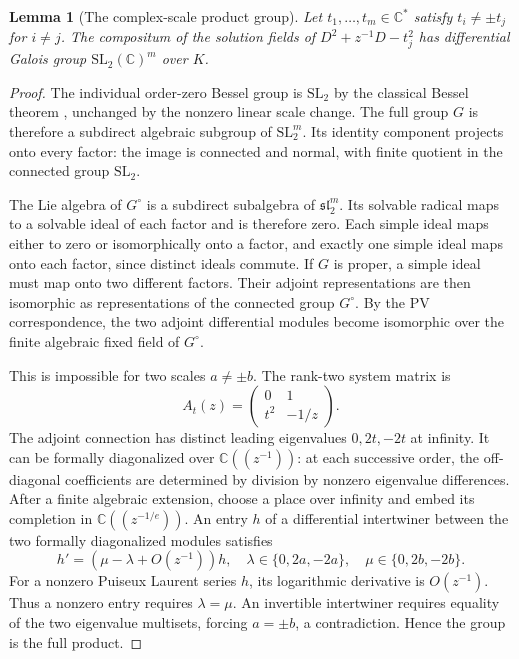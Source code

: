 \documentclass[11pt]{article}
\newtheorem{lemma}[theorem]{Lemma}
\theoremstyle{definition}
\theoremstyle{remark}
\begin{document}
\begin{lemma}[The complex-scale product group]\label{cf:product}
Let $t_1,\ldots,t_m\in\mathbb C^*$ satisfy $t_i\ne\pm t_j$ for $i\ne j$.
The compositum of the solution fields of
$D^2+z^{-1}D-t_j^2$ has differential Galois group
$\mathrm{SL}_2(\mathbb C)^m$ over $K$.
\end{lemma}
\begin{proof}
The individual order-zero Bessel group is $\mathrm{SL}_2$ by the classical
Bessel theorem \cite{Kolchin}, unchanged by the nonzero linear scale change.
The full group $G$ is therefore a subdirect algebraic subgroup of
$\mathrm{SL}_2^m$. Its identity component projects onto every factor:
the image is connected and normal, with finite quotient in the connected
group $\mathrm{SL}_2$.

The Lie algebra of $G^\circ$ is a subdirect subalgebra of
$\mathfrak{sl}_2^m$. Its solvable radical maps to a solvable ideal of each
factor and is therefore zero. Each simple ideal maps either to zero or
isomorphically onto a factor, and exactly one simple ideal maps onto each
factor, since distinct ideals commute. If $G$ is proper, a simple ideal
must map onto two different factors. Their adjoint representations are
then isomorphic as representations of the connected group $G^\circ$.
By the PV correspondence, the two adjoint differential modules become
isomorphic over the finite algebraic fixed field of $G^\circ$.

This is impossible for two scales $a\ne\pm b$. The rank-two system matrix
is
\[
 A_t(z)=\begin{pmatrix}0&1\\t^2&-1/z\end{pmatrix}.
\]
The adjoint connection has distinct leading eigenvalues
$0,2t,-2t$ at infinity. It can be formally diagonalized over
$\mathbb C((z^{-1}))$: at each successive order, the off-diagonal
coefficients are determined by division by nonzero eigenvalue differences.
After a finite algebraic extension, choose a place over infinity and embed
its completion in $\mathbb C((z^{-1/e}))$. An entry $h$ of a differential
intertwiner between the two formally diagonalized modules satisfies
\[
 h'=(\mu-\lambda+O(z^{-1}))h,
 \quad \lambda\in\{0,2a,-2a\},\quad\mu\in\{0,2b,-2b\}.
\]
For a nonzero Puiseux Laurent series $h$, its logarithmic derivative is
$O(z^{-1})$. Thus a nonzero entry requires $\lambda=\mu$. An invertible
intertwiner requires equality of the two eigenvalue multisets, forcing
$a=\pm b$, a contradiction. Hence the group is the full product.
\end{proof}
\end{document}
